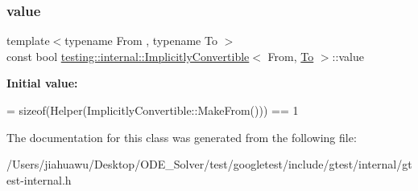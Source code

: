 \subsubsection{\texorpdfstring{value}{value}}
{\footnotesize\ttfamily template$<$typename From , typename To $>$ \\
const bool \mbox{\hyperlink{classtesting_1_1internal_1_1_implicitly_convertible}{testing\+::internal\+::\+Implicitly\+Convertible}}$<$ From, \mbox{\hyperlink{classtesting_1_1internal_1_1_to}{To}} $>$\+::value\hspace{0.3cm}{\ttfamily [static]}}

{\bfseries Initial value\+:}
\begin{DoxyCode}
=
      \textcolor{keyword}{sizeof}(Helper(ImplicitlyConvertible::MakeFrom())) == 1
\end{DoxyCode}


The documentation for this class was generated from the following file\+:\begin{DoxyCompactItemize}
\item 
/\+Users/jiahuawu/\+Desktop/\+O\+D\+E\+\_\+\+Solver/test/googletest/include/gtest/internal/gtest-\/internal.\+h\end{DoxyCompactItemize}
